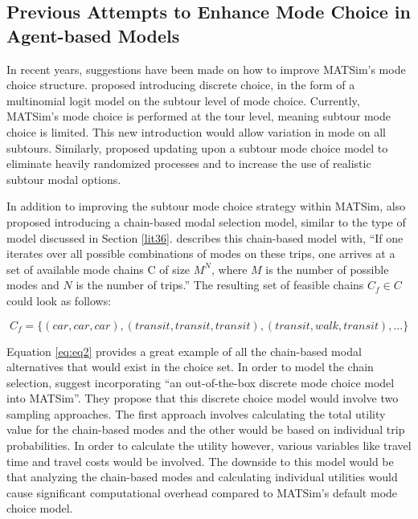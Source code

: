 \documentclass[3p, authoryear, review]{elsarticle} %
\begin{document}
\hypertarget{lit8}{%
\subsection{Previous Attempts to Enhance Mode Choice in Agent-based Models}\label{lit8}}

In recent years, suggestions have been made on how to improve MATSim's mode choice structure. \citet{ax08} proposed introducing discrete choice, in the form of a multinomial logit model on the subtour level of mode choice. Currently, MATSim's mode choice is performed at the tour level, meaning subtour mode choice is limited. This new introduction would allow variation in mode on all subtours. Similarly, \citet{horl18} proposed updating upon a subtour mode choice model to eliminate heavily randomized processes and to increase the use of realistic subtour modal options.

In addition to improving the subtour mode choice strategy within MATSim, \citet{horl18} also proposed introducing a chain-based modal selection model, similar to the type of model discussed in Section \ref{lit36}. \citet{horl18} describes this chain-based model with, ``If one iterates over all possible combinations of modes on these trips, one arrives at a set of available mode chains C of size \(M^{N}\), where \(M\) is the number of possible modes and \(N\) is the number of trips.'' The resulting set of feasible chains \(C_f \in C\) could look as follows:

\begin{equation} 
  C_f = \{(car,car,car),(transit,transit,transit),(transit,walk,transit),...\}
  \label{eq:eq2}
\end{equation}

Equation \eqref{eq:eq2} provides a great example of all the chain-based modal alternatives that would exist in the choice set. In order to model the chain selection, \citet{horl18} suggest incorporating ``an out-of-the-box discrete mode choice model into MATSim''. They propose that this discrete choice model would involve two sampling approaches. The first approach involves calculating the total utility value for the chain-based modes and the other would be based on individual trip probabilities. In order to calculate the utility however, various variables like travel time and travel costs would be involved. The downside to this model would be that analyzing the chain-based modes and calculating individual utilities would cause significant computational overhead compared to MATSim's default mode choice model.
\end{document}
